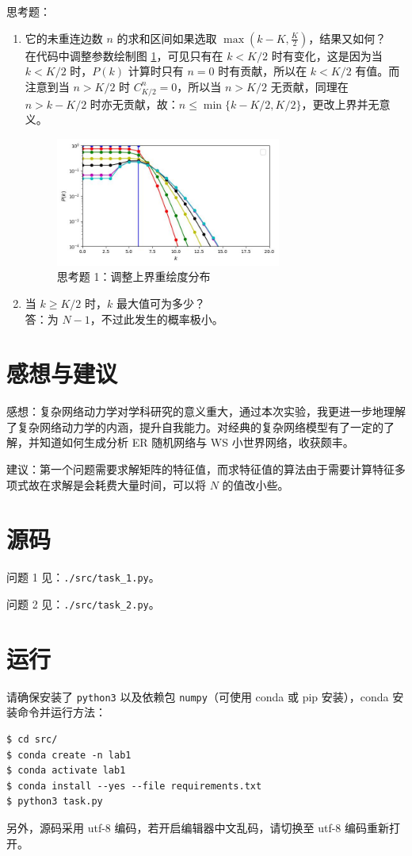 \documentclass{article}
\begin{document}
思考题：
\begin{enumerate}
    \item 它的未重连边数 $n$ 的求和区间如果选取 $\max(k-K,\frac{K}{2})$，结果又如何？\\
    在代码中调整参数绘制图 \ref{fig:task2_fake}，可见只有在 $k<K/2$ 时有变化，这是因为当 $k<K/2$ 时，$P(k)$ 计算时只有 $n=0$ 时有贡献，所以在 $k<K/2$ 有值。而注意到当 $n>K/2$ 时 $C_{K/2}^{n}=0$，所以当 $n>K/2$ 无贡献，同理在 $n>k-K/2$ 时亦无贡献，故：$n\leq\min\{k-K/2,K/2\}$，更改上界并无意义。
    \begin{figure}[ht]
        \label{fig:task2_fake}
        \centering
        \includegraphics[width=0.7\textwidth]{../task2_fake.jpg}
        \caption{思考题 1：调整上界重绘度分布}
    \end{figure}
    \item 当 $k\geq K/2$ 时，$k$ 最大值可为多少？\\
    答：为 $N-1$，不过此发生的概率极小。
\end{enumerate}

\newpage

\section{感想与建议}

感想：复杂网络动力学对学科研究的意义重大，通过本次实验，我更进一步地理解了复杂网络动力学的内涵，提升自我能力。对经典的复杂网络模型有了一定的了解，并知道如何生成分析 ER 随机网络与 WS 小世界网络，收获颇丰。

建议：第一个问题需要求解矩阵的特征值，而求特征值的算法由于需要计算特征多项式故在求解是会耗费大量时间，可以将 $N$ 的值改小些。

\section{源码}

问题 1 见：\lstinline{./src/task_1.py}。

问题 2 见：\lstinline{./src/task_2.py}。

\section{运行}

请确保安装了 \lstinline{python3} 以及依赖包 \lstinline{numpy}（可使用 conda 或 pip 安装），conda 安装命令并运行方法：
\begin{lstlisting}
$ cd src/
$ conda create -n lab1
$ conda activate lab1
$ conda install --yes --file requirements.txt
$ python3 task.py
\end{lstlisting}

另外，源码采用 utf-8 编码，若开启编辑器中文乱码，请切换至 utf-8 编码重新打开。
\end{document}
